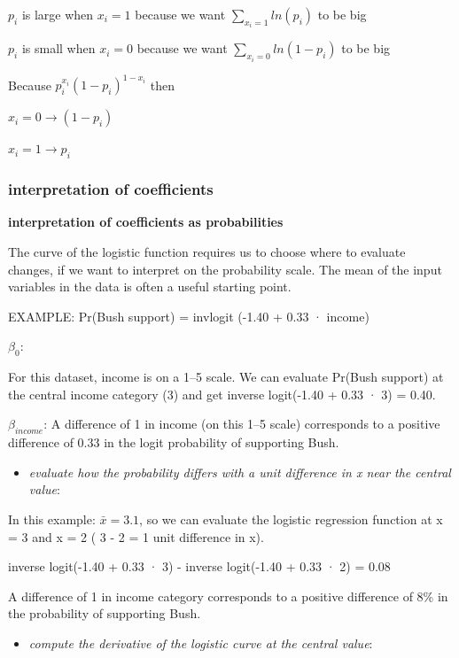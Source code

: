 \documentclass[
]{article}
\providecommand{\tightlist}{%
  \setlength{\itemsep}{0pt}\setlength{\parskip}{0pt}}
\begin{document}
\(p_{i}\) is large when \(x_{i} = 1\) because we want
\(\sum_{x_{i} = 1} ln (p_{i})\) to be big

\(p_{i}\) is small when \(x_{i} = 0\) because we want
\(\sum_{x_{i} = 0}ln(1-p_{i})\) to be big

Because \(p_{i}^{x_{i}}(1-p_{i})^{1-x_{i}}\) then

\(x_{i} = 0 \rightarrow (1-p_{i})\)

\(x_{i} = 1 \rightarrow p_{i}\)

\hypertarget{interpretation-of-coefficients-1}{%
\subsubsection{interpretation of
coefficients}\label{interpretation-of-coefficients-1}}

\textbf{interpretation of coefficients as probabilities}

The curve of the logistic function requires us to choose where to
evaluate changes, if we want to interpret on the probability scale. The
mean of the input variables in the data is often a useful starting
point.

EXAMPLE: Pr(Bush support) = invlogit (-1.40 + 0.33 · income)

\(\beta_0\):

For this dataset, income is on a 1--5 scale. We can evaluate Pr(Bush
support) at the central income category (3) and get inverse logit(-1.40
+ 0.33 · 3) = 0.40.

\(\beta_{income}\): A difference of 1 in income (on this 1--5 scale)
corresponds to a positive difference of 0.33 in the logit probability of
supporting Bush.

\begin{itemize}
\tightlist
\item
  \emph{evaluate how the probability differs with a unit difference in x
  near the central value}:
\end{itemize}

In this example: \(\bar{x}= 3.1\), so we can evaluate the logistic
regression function at x = 3 and x = 2 ( 3 - 2 = 1 unit difference in
x).

inverse logit(-1.40 + 0.33 · 3) - inverse logit(-1.40 + 0.33 · 2) = 0.08

A difference of 1 in income category corresponds to a positive
difference of 8\% in the probability of supporting Bush.

\begin{itemize}
\tightlist
\item
  \emph{compute the derivative of the logistic curve at the central
  value}:
\end{itemize}
\end{document}
